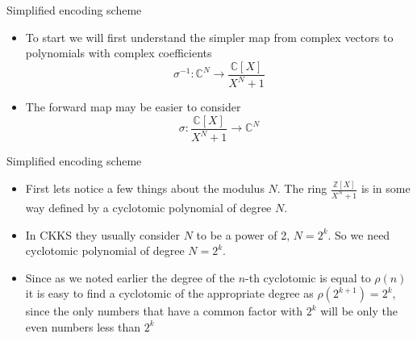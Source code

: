 \documentclass{beamer}
\begin{document}
\begin{frame}{Simplified encoding scheme}
	\begin{itemize}[<+->]
		\item To start we will first understand the simpler map from complex vectors to polynomials with complex
		coefficients 
		$$\sigma^{-1} : \mathbb{C}^N \to \frac{\mathbb{C}[X]}{X^N + 1}$$
		\item The forward map may be easier to consider
		$$\sigma: \frac{\mathbb{C}[X]}{X^N + 1} \to \mathbb{C}^N$$
	\end{itemize}
\end{frame}

\begin{frame}{Simplified encoding scheme}
	\begin{itemize}[<+->]
		\item First lets notice a few things about the modulus $N$. The ring $\frac{\mathbb{Z}[X]}{X^N + 1}$
		is in some way defined by a cyclotomic polynomial of degree $N$.
		\item In CKKS they usually consider $N$ to be a power of 2, $N = 2^k$. So we need cyclotomic
		polynomial of degree $N = 2^k$.
		\item Since as we noted earlier the degree of the $n$-th cyclotomic is equal to $\rho(n)$
		it is easy to find a cyclotomic of the appropriate degree as $\rho(2^{k+1}) = 2^k$, since the
		only numbers that have a common factor with $2^k$ will be only the even numbers less than $2^k$
	\end{itemize}
\end{frame}
\end{document}
